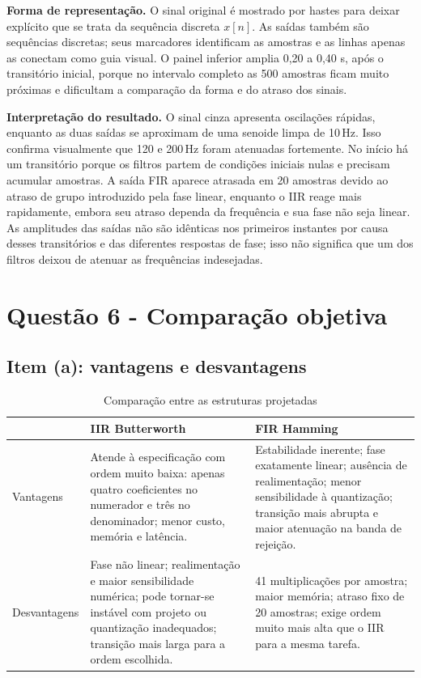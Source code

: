 \documentclass[12pt,oneside,a4paper,chapter=TITLE,section=TITLE,brazil]{abntex2}
\newcommand{\SI}[2]{#1\,#2}
\newcommand{\hertz}{\ensuremath{\mathrm{Hz}}}
\begin{document}
\noindent\textbf{Forma de representação.} O sinal original é mostrado por hastes para
deixar explícito que se trata da sequência discreta $x[n]$. As saídas também são
sequências discretas; seus marcadores identificam as amostras e as linhas apenas as
conectam como guia visual. O painel inferior amplia 0,20 a 0,40 s, após o transitório
inicial, porque no intervalo completo as 500 amostras ficam muito próximas e dificultam
a comparação da forma e do atraso dos sinais.

\noindent\textbf{Interpretação do resultado.} O sinal cinza apresenta oscilações
rápidas, enquanto as duas saídas se aproximam de uma senoide limpa de
\SI{10}{\hertz}. Isso confirma visualmente que 120 e \SI{200}{\hertz} foram
atenuadas fortemente. No início há um transitório porque os filtros partem de
condições iniciais nulas e precisam acumular amostras. A saída FIR aparece atrasada em
20 amostras devido ao atraso de grupo introduzido pela fase linear, enquanto o IIR reage
mais rapidamente, embora seu atraso dependa da frequência e sua fase não seja linear.
As amplitudes das saídas não são idênticas nos primeiros instantes por causa desses
transitórios e das diferentes respostas de fase; isso não significa que um dos filtros
deixou de atenuar as frequências indesejadas.

\chapter{Questão 6 - Comparação objetiva}
\section{Item (a): vantagens e desvantagens}
\begin{table}[H]\centering
\caption{Comparação entre as estruturas projetadas}\label{tab:comparacao}
\small
\begin{tabular}{@{}E{2.6cm}E{5.2cm}E{5.2cm}@{}}\toprule
&\textbf{IIR Butterworth}&\textbf{FIR Hamming}\\\midrule
Vantagens&Atende à especificação com ordem muito baixa: apenas quatro coeficientes no numerador e três no denominador; menor custo, memória e latência.&Estabilidade inerente; fase exatamente linear; ausência de realimentação; menor sensibilidade à quantização; transição mais abrupta e maior atenuação na banda de rejeição.\\
Desvantagens&Fase não linear; realimentação e maior sensibilidade numérica; pode tornar-se instável com projeto ou quantização inadequados; transição mais larga para a ordem escolhida.&41 multiplicações por amostra; maior memória; atraso fixo de 20 amostras; exige ordem muito mais alta que o IIR para a mesma tarefa.\\\bottomrule
\end{tabular}
\end{table}
\end{document}
